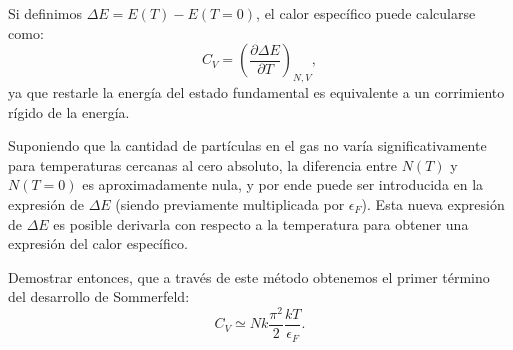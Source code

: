 \documentclass[a4paper,11pt]{article}
\begin{document}
\begin{enumerate}[label=(\alph*),
                  leftmargin=2\parindent,
                  rightmargin=2\parindent]
{          Si definimos $\Delta E = E(T) - E(T=0)$, el calor específico 
          puede calcularse como:
          $$
          C_V =
          \left( \frac{\partial \Delta E}{\partial T} \right)_{N, V},
          $$
          ya que restarle la energía del estado fundamental es 
          equivalente a un corrimiento rígido de la energía.
          
          Suponiendo que la cantidad de partículas en el gas no varía 
          significativamente para temperaturas cercanas al cero 
          absoluto, la diferencia entre $N(T)$ y $N(T=0)$ es 
          aproximadamente nula, y por ende puede ser introducida en la 
          expresión de $\Delta E$ (siendo previamente multiplicada por 
          $\epsilon_F$).
          Esta nueva expresión de $\Delta E$ es posible derivarla con 
          respecto a la temperatura para obtener una expresión del 
          calor específico.
          
          Demostrar entonces, que a través de este método obtenemos 
          el primer término del desarrollo de Sommerfeld:
          $$ C_V \simeq N k \frac{\pi^2}{2} \frac{kT}{\epsilon_F}. $$
          
         }

\end{enumerate}
\end{document}
